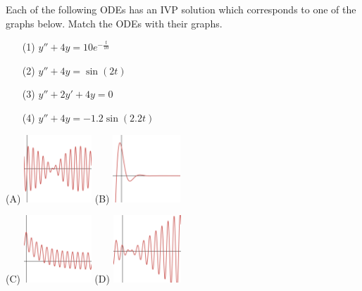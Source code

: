 \documentclass{workbook}
\begin{document}
\begin{slide}
	\question
    Each of the following ODEs has an IVP solution  which corresponds to one of the graphs below. Match the ODEs with their graphs.
    \vspace{.5cm}

    \begin{enumerate}
        \item[(1)] $\displaystyle y''+4y=10e^{-\frac{t}{10}}$
        \vspace{.5cm}
        \item[(2)] $\displaystyle y''+4y=\sin(2t)$
        \vspace{.5cm}
        \item[(3)] $\displaystyle y''+2y'+4y=0$
        \vspace{.5cm}
        \item[(4)] $\displaystyle y''+4y=-1.2\sin(2.2t)$
    \end{enumerate}

         (A) \includegraphics[width=1in]{images/E7-Close.png}
         \qquad(B) \includegraphics[width=1in]{images/E7-Damped.png}

         (C) \includegraphics[width=1in]{images/E7-Exp.png}
         \qquad (D) \includegraphics[width=1in]{images/E7-Res.png}

\end{slide}
\end{document}
